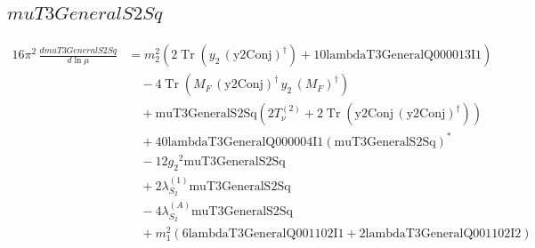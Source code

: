 \documentclass[10pt,a4paper]{article}
\begin{document}
\subsection*{$muT3GeneralS2Sq$}
\begin{align*}
16\pi^2\,\frac{d muT3GeneralS2Sq}{d\ln\mu} &={m_2^2} (2 \operatorname{Tr}\!\left({y_2}\,\left(\text{y2Conj}\right)^{\dagger}\right)+10 \text{lambdaT3GeneralQ000013I1}) \\
&\quad -4 \operatorname{Tr}\!\left({M_F}\,\left(\text{y2Conj}\right)^{\dagger}\,{y_2}\,\left({M_F}\right)^{\dagger}\right) \\
&\quad +\text{muT3GeneralS2Sq} (2 T_{\nu}^{(2)}+2 \operatorname{Tr}\!\left(\text{y2Conj}\,\left(\text{y2Conj}\right)^{\dagger}\right)) \\
&\quad +40 \text{lambdaT3GeneralQ000004I1} \left(\text{muT3GeneralS2Sq}\right)^{*} \\
&\quad -12 {g_2}^2 \text{muT3GeneralS2Sq} \\
&\quad +2 {\lambda_{S_2}^{(1)}} \text{muT3GeneralS2Sq} \\
&\quad -4 {\lambda_{S_2}^{(A)}} \text{muT3GeneralS2Sq} \\
&\quad +{m_1^2} (6 \text{lambdaT3GeneralQ001102I1}+2 \text{lambdaT3GeneralQ001102I2}) \\
\end{align*}
\end{document}
